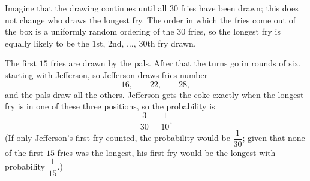 Imagine that the drawing continues until all $30$ fries have been drawn; this does not change who draws the longest fry. The order in which the fries come out of the box is a uniformly random ordering of the $30$ fries, so the longest fry is equally likely to be the $1$st, $2$nd, $\dots$, $30$th fry drawn.

The first $15$ fries are drawn by the pals. After that the turns go in rounds of six, starting with Jefferson, so Jefferson draws fries number
\[16,\qquad 22,\qquad 28,\]
and the pals draw all the others. Jefferson gets the coke exactly when the longest fry is in one of these three positions, so the probability is
\[\dfrac{3}{30}=\boxed{\dfrac{1}{10}}.\]
(If only Jefferson's first fry counted, the probability would be $\dfrac{1}{30}$; given that none of the first $15$ fries was the longest, his first fry would be the longest with probability $\dfrac{1}{15}$.)
